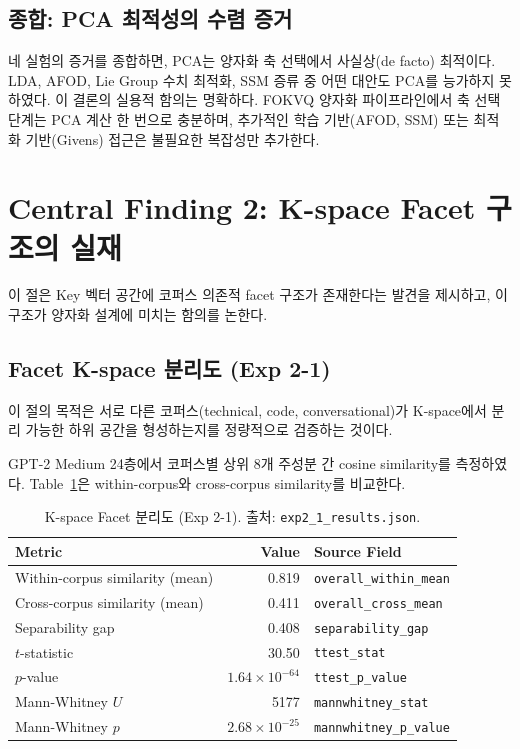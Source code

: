 \documentclass[11pt,a4paper]{article}
\begin{document}
\subsection{종합: PCA 최적성의 수렴 증거}

네 실험의 증거를 종합하면, PCA는 양자화 축 선택에서 사실상(de facto) 최적이다.
LDA, AFOD, Lie Group 수치 최적화, SSM 증류 중 어떤 대안도 PCA를 능가하지 못하였다.
이 결론의 실용적 함의는 명확하다.
FOKVQ 양자화 파이프라인에서 축 선택 단계는 PCA 계산 한 번으로 충분하며, 추가적인 학습 기반(AFOD, SSM) 또는 최적화 기반(Givens) 접근은 불필요한 복잡성만 추가한다.

\section{Central Finding 2: K-space Facet 구조의 실재}

이 절은 Key 벡터 공간에 코퍼스 의존적 facet 구조가 존재한다는 발견을 제시하고, 이 구조가 양자화 설계에 미치는 함의를 논한다.

\subsection{Facet K-space 분리도 (Exp 2-1)}
\label{sec:exp21}

이 절의 목적은 서로 다른 코퍼스(technical, code, conversational)가 K-space에서 분리 가능한 하위 공간을 형성하는지를 정량적으로 검증하는 것이다.

GPT-2 Medium 24층에서 코퍼스별 상위 8개 주성분 간 cosine similarity를 측정하였다.
Table~\ref{tab:exp21_main}은 within-corpus와 cross-corpus similarity를 비교한다.

\begin{table}[H]
\centering
\caption{K-space Facet 분리도 (Exp 2-1). 출처: \texttt{exp2\_1\_results.json}.}
\label{tab:exp21_main}
\begin{tabular}{lrl}
\toprule
\textbf{Metric} & \textbf{Value} & \textbf{Source Field} \\
\midrule
Within-corpus similarity (mean) & 0.819 & \texttt{overall\_within\_mean} \\
Cross-corpus similarity (mean) & 0.411 & \texttt{overall\_cross\_mean} \\
Separability gap & 0.408 & \texttt{separability\_gap} \\
$t$-statistic & 30.50 & \texttt{ttest\_stat} \\
$p$-value & $1.64 \times 10^{-64}$ & \texttt{ttest\_p\_value} \\
Mann-Whitney $U$ & 5177 & \texttt{mannwhitney\_stat} \\
Mann-Whitney $p$ & $2.68 \times 10^{-25}$ & \texttt{mannwhitney\_p\_value} \\
\bottomrule
\end{tabular}
\end{table}
\end{document}
